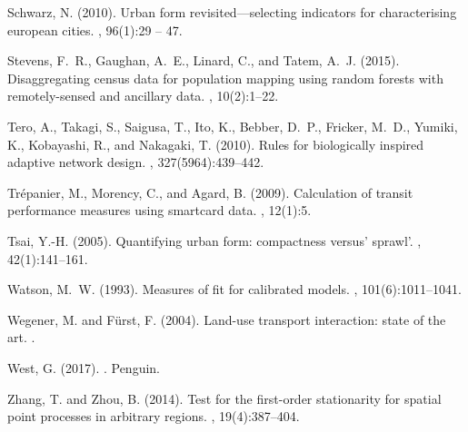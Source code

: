 \documentclass[11pt]{article}
\begin{document}
\begin{thebibliography}{}
Schwarz, N. (2010).
\newblock Urban form revisited---selecting indicators for characterising
  european cities.
, 96(1):29 -- 47.

Stevens, F.~R., Gaughan, A.~E., Linard, C., and Tatem, A.~J. (2015).
\newblock Disaggregating census data for population mapping using random
  forests with remotely-sensed and ancillary data.
, 10(2):1--22.

Tero, A., Takagi, S., Saigusa, T., Ito, K., Bebber, D.~P., Fricker, M.~D.,
  Yumiki, K., Kobayashi, R., and Nakagaki, T. (2010).
\newblock Rules for biologically inspired adaptive network design.
, 327(5964):439--442.

Tr{\'e}panier, M., Morency, C., and Agard, B. (2009).
\newblock Calculation of transit performance measures using smartcard data.
, 12(1):5.

Tsai, Y.-H. (2005).
\newblock Quantifying urban form: compactness versus' sprawl'.
, 42(1):141--161.

Watson, M.~W. (1993).
\newblock Measures of fit for calibrated models.
, 101(6):1011--1041.

Wegener, M. and F{\"u}rst, F. (2004).
\newblock Land-use transport interaction: state of the art.
.

West, G. (2017).
.
\newblock Penguin.

Zhang, T. and Zhou, B. (2014).
\newblock Test for the first-order stationarity for spatial point processes in
  arbitrary regions.
, 19(4):387--404.

\end{thebibliography}
\end{document}
